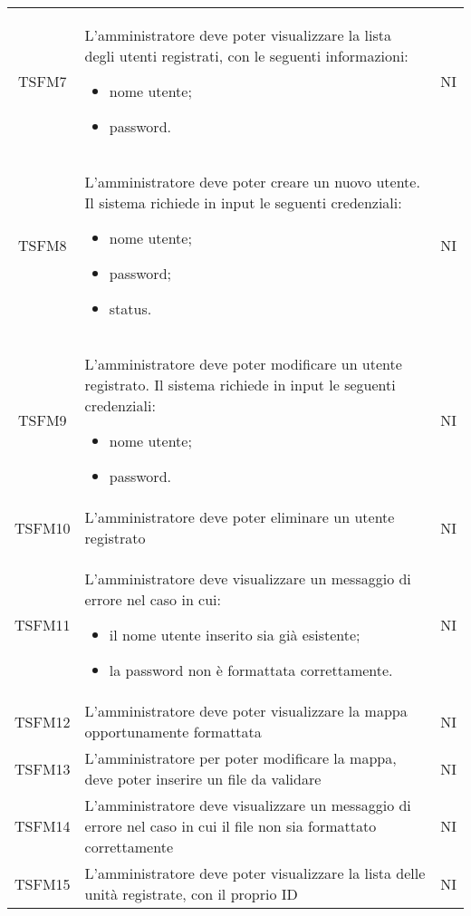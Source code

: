 \begin{longtable}[h!] { c  m{12cm} c}
		TSFM7 & L'amministratore deve poter visualizzare la lista degli utenti registrati, con le seguenti informazioni:
					\begin{itemize}
						\item nome utente;
						\item password.
					\end{itemize}
									& NI \\
		TSFM8 & L'amministratore deve poter creare un nuovo utente. Il sistema richiede in input le seguenti credenziali:
					\begin{itemize}
						\item nome utente;
						\item password;
						\item status.
					\end{itemize}
										& NI \\

		TSFM9  & L'amministratore deve poter modificare un utente registrato. Il sistema richiede in input le seguenti credenziali:
					\begin{itemize}
						\item nome utente;
						\item password.
					\end{itemize}
											& NI \\
		TSFM10 & L'amministratore deve poter eliminare un utente registrato & NI \\

		TSFM11 & L'amministratore deve visualizzare un messaggio di errore nel caso in cui:
						\begin{itemize}
						\item il nome utente inserito sia già esistente;
						\item la password non è formattata correttamente.
					\end{itemize}
										& NI \\
		TSFM12   & L'amministratore deve poter visualizzare la mappa opportunamente formattata & NI\\

		TSFM13   & L'amministratore per poter modificare la mappa, deve poter inserire un file da validare & NI\\

		TSFM14 & L'amministratore deve visualizzare un messaggio di errore nel caso in cui il file non sia formattato correttamente & NI \\

		TSFM15   & L'amministratore deve poter visualizzare la lista delle unità registrate, con il proprio ID & NI\\


\end{longtable}
